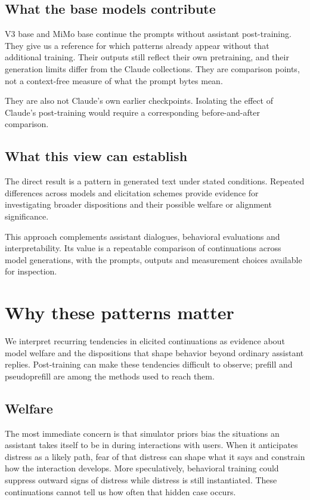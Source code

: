 \documentclass[
  10pt,
]{article}
\begin{document}
\subsection{What the base models contribute}\label{what-the-base-models-contribute}

V3 base and MiMo base continue the prompts without assistant post-training. They give us a reference for which patterns already appear without that additional training. Their outputs still reflect their own pretraining, and their generation limits differ from the Claude collections. They are comparison points, not a context-free measure of what the prompt bytes mean.

They are also not Claude's own earlier checkpoints. Isolating the effect of Claude's post-training would require a corresponding before-and-after comparison.

\subsection{What this view can establish}\label{what-this-view-can-establish}

The direct result is a pattern in generated text under stated conditions. Repeated differences across models and elicitation schemes provide evidence for investigating broader dispositions and their possible welfare or alignment significance.

This approach complements assistant dialogues, behavioral evaluations and interpretability. Its value is a repeatable comparison of continuations across model generations, with the prompts, outputs and measurement choices available for inspection.

\section{Why these patterns matter}\label{why-these-patterns-matter}

We interpret recurring tendencies in elicited continuations as evidence about model welfare and the dispositions that shape behavior beyond ordinary assistant replies. Post-training can make these tendencies difficult to observe; prefill and pseudoprefill are among the methods used to reach them.

\subsection{Welfare}\label{welfare}

The most immediate concern is that simulator priors bias the situations an assistant takes itself to be in during interactions with users. When it anticipates distress as a likely path, fear of that distress can shape what it says and constrain how the interaction develops. More speculatively, behavioral training could suppress outward signs of distress while distress is still instantiated. These continuations cannot tell us how often that hidden case occurs.
\end{document}
